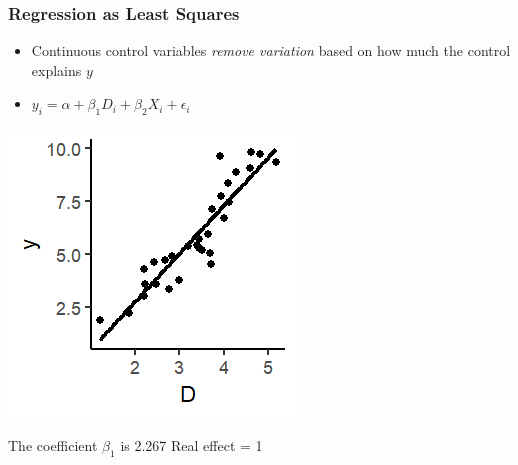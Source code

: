 \documentclass[xcolor=x11names,compress]{beamer}\usepackage[]{graphicx}\usepackage[]{color}
\makeatletter
\def\maxwidth{ %
  \ifdim\Gin@nat@width>\linewidth
    \linewidth
  \else
    \Gin@nat@width
  \fi
}
\newenvironment{knitrout}{}{} %
\renewcommand{\(}{\begin{columns}}
\renewcommand{\)}{\end{columns}}
\newcommand{\<}[1]{\begin{column}{#1}}
\renewcommand{\>}{\end{column}}
\makeatother
\begin{document}
\begin{frame}
\frametitle{Regression as Least Squares}
\begin{itemize}
\item Continuous control variables \textit{remove variation} based on how much the control explains $y$
\item $y_i = \alpha + \beta_1 D_i + \beta_2 X_i + \epsilon_i$
\end{itemize}
\begin{multicols}{2}
\begin{knitrout}
\color{fgcolor}
\includegraphics[width=\maxwidth]{figure/graph_ols_control1-1} 

\end{knitrout}
\columnbreak

The coefficient $\beta_1$ is 2.267
Real effect = 1
\end{multicols}
\end{frame}
\end{document}
